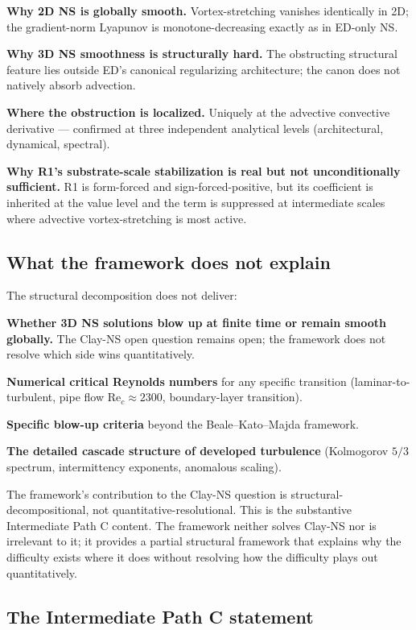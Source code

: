 \documentclass[11pt,a4paper]{article}
\begin{document}
\textbf{Why 2D NS is globally smooth.} Vortex-stretching vanishes identically in 2D; the gradient-norm Lyapunov is monotone-decreasing exactly as in ED-only NS.

\textbf{Why 3D NS smoothness is structurally hard.} The obstructing structural feature lies outside ED's canonical regularizing architecture; the canon does not natively absorb advection.

\textbf{Where the obstruction is localized.} Uniquely at the advective convective derivative --- confirmed at three independent analytical levels (architectural, dynamical, spectral).

\textbf{Why R1's substrate-scale stabilization is real but not unconditionally sufficient.} R1 is form-forced and sign-forced-positive, but its coefficient is inherited at the value level and the term is suppressed at intermediate scales where advective vortex-stretching is most active.

\subsection{What the framework does not explain}

The structural decomposition does not deliver:

\textbf{Whether 3D NS solutions blow up at finite time or remain smooth globally.} The Clay-NS open question remains open; the framework does not resolve which side wins quantitatively.

\textbf{Numerical critical Reynolds numbers} for any specific transition (laminar-to-turbulent, pipe flow $\mathrm{Re}_c \approx 2300$, boundary-layer transition).

\textbf{Specific blow-up criteria} beyond the Beale--Kato--Majda framework.

\textbf{The detailed cascade structure of developed turbulence} (Kolmogorov $5/3$ spectrum, intermittency exponents, anomalous scaling).

The framework's contribution to the Clay-NS question is structural-decompositional, not quantitative-resolutional. This is the substantive Intermediate Path C content. The framework neither solves Clay-NS nor is irrelevant to it; it provides a partial structural framework that explains why the difficulty exists where it does without resolving how the difficulty plays out quantitatively.

\subsection{The Intermediate Path C statement}
\end{document}
